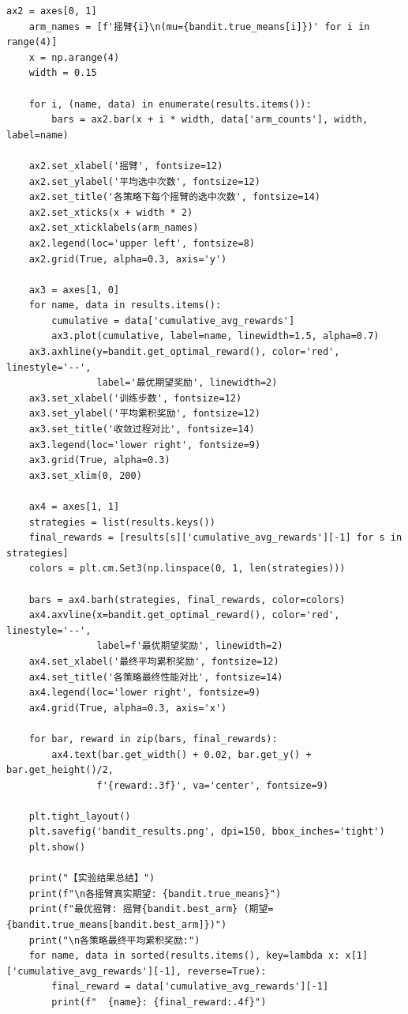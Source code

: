 \documentclass[12pt,a4paper]{article}
\begin{document}
\begin{lstlisting}[caption={强化学习实验完整代码}]
    ax2 = axes[0, 1]
    arm_names = [f'摇臂{i}\n(mu={bandit.true_means[i]})' for i in range(4)]
    x = np.arange(4)
    width = 0.15
    
    for i, (name, data) in enumerate(results.items()):
        bars = ax2.bar(x + i * width, data['arm_counts'], width, label=name)
    
    ax2.set_xlabel('摇臂', fontsize=12)
    ax2.set_ylabel('平均选中次数', fontsize=12)
    ax2.set_title('各策略下每个摇臂的选中次数', fontsize=14)
    ax2.set_xticks(x + width * 2)
    ax2.set_xticklabels(arm_names)
    ax2.legend(loc='upper left', fontsize=8)
    ax2.grid(True, alpha=0.3, axis='y')
    
    ax3 = axes[1, 0]
    for name, data in results.items():
        cumulative = data['cumulative_avg_rewards']
        ax3.plot(cumulative, label=name, linewidth=1.5, alpha=0.7)
    ax3.axhline(y=bandit.get_optimal_reward(), color='red', linestyle='--', 
                label='最优期望奖励', linewidth=2)
    ax3.set_xlabel('训练步数', fontsize=12)
    ax3.set_ylabel('平均累积奖励', fontsize=12)
    ax3.set_title('收敛过程对比', fontsize=14)
    ax3.legend(loc='lower right', fontsize=9)
    ax3.grid(True, alpha=0.3)
    ax3.set_xlim(0, 200)
    
    ax4 = axes[1, 1]
    strategies = list(results.keys())
    final_rewards = [results[s]['cumulative_avg_rewards'][-1] for s in strategies]
    colors = plt.cm.Set3(np.linspace(0, 1, len(strategies)))
    
    bars = ax4.barh(strategies, final_rewards, color=colors)
    ax4.axvline(x=bandit.get_optimal_reward(), color='red', linestyle='--', 
                label=f'最优期望奖励', linewidth=2)
    ax4.set_xlabel('最终平均累积奖励', fontsize=12)
    ax4.set_title('各策略最终性能对比', fontsize=14)
    ax4.legend(loc='lower right', fontsize=9)
    ax4.grid(True, alpha=0.3, axis='x')
    
    for bar, reward in zip(bars, final_rewards):
        ax4.text(bar.get_width() + 0.02, bar.get_y() + bar.get_height()/2, 
                f'{reward:.3f}', va='center', fontsize=9)
    
    plt.tight_layout()
    plt.savefig('bandit_results.png', dpi=150, bbox_inches='tight')
    plt.show()
    
    print("【实验结果总结】")
    print(f"\n各摇臂真实期望: {bandit.true_means}")
    print(f"最优摇臂: 摇臂{bandit.best_arm} (期望={bandit.true_means[bandit.best_arm]})")
    print("\n各策略最终平均累积奖励:")
    for name, data in sorted(results.items(), key=lambda x: x[1]['cumulative_avg_rewards'][-1], reverse=True):
        final_reward = data['cumulative_avg_rewards'][-1]
        print(f"  {name}: {final_reward:.4f}")
    

\end{lstlisting}
\end{document}
